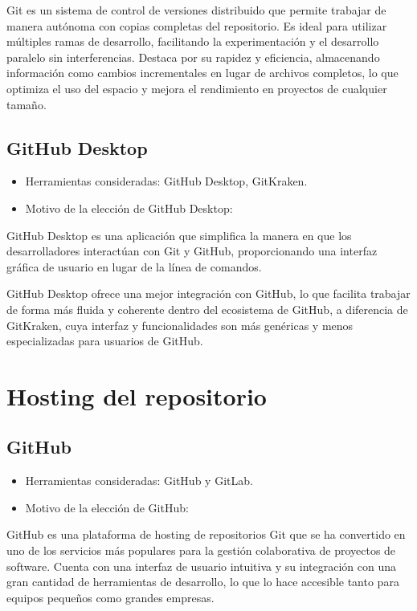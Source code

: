 Git es un sistema de control de versiones distribuido que permite trabajar de manera autónoma con copias completas del repositorio. Es ideal para utilizar múltiples ramas de desarrollo, facilitando la experimentación y el desarrollo paralelo sin interferencias. Destaca por su rapidez y eficiencia, almacenando información como cambios incrementales en lugar de archivos completos, lo que optimiza el uso del espacio y mejora el rendimiento en proyectos de cualquier tamaño.

\subsection{GitHub Desktop}\label{gitHub-desktop}

\begin{itemize}
    \item Herramientas consideradas: GitHub Desktop, GitKraken.
    \item Motivo de la elección de GitHub Desktop:
\end{itemize}

GitHub Desktop es una aplicación que simplifica la manera en que los desarrolladores interactúan con Git y GitHub, proporcionando una interfaz gráfica de usuario en lugar de la línea de comandos.

GitHub Desktop ofrece una mejor integración con GitHub, lo que facilita trabajar de forma más fluida y coherente dentro del ecosistema de GitHub, a diferencia de GitKraken, cuya interfaz y funcionalidades son más genéricas y menos especializadas para usuarios de GitHub.

\section{Hosting del repositorio}\label{hosting-del-repositorio}

\subsection{GitHub}\label{github}

\begin{itemize}
    \item Herramientas consideradas: GitHub y GitLab.
    \item Motivo de la elección de GitHub:
\end{itemize}

GitHub es una plataforma de hosting de repositorios Git que se ha convertido en uno de los servicios más populares para la gestión colaborativa de proyectos de software. Cuenta con una interfaz de usuario intuitiva y su integración con una gran cantidad de herramientas de desarrollo, lo que lo hace accesible tanto para equipos pequeños como grandes empresas. 

